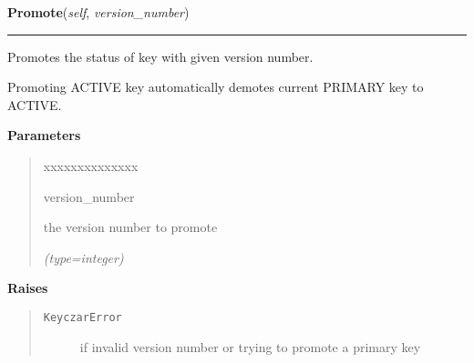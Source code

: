     \label{keyczar:keyczar:Keyczar:Promote}

    \vspace{0.5ex}

\hspace{.8\funcindent}\begin{boxedminipage}{\funcwidth}

    \raggedright \textbf{Promote}(\textit{self}, \textit{version\_number})

    \vspace{-1.5ex}

    \rule{\textwidth}{0.5\fboxrule}
\setlength{\parskip}{2ex}
    Promotes the status of key with given version number.

    Promoting ACTIVE key automatically demotes current PRIMARY key to 
    ACTIVE.

\setlength{\parskip}{1ex}
      \textbf{Parameters}
      \vspace{-1ex}

      \begin{quote}
        \begin{Ventry}{xxxxxxxxxxxxxx}

          \item[version\_number]

          the version number to promote

            {\it (type=integer)}

        \end{Ventry}

      \end{quote}

      \textbf{Raises}
    \vspace{-1ex}

      \begin{quote}
        \begin{description}

          \item[\texttt{KeyczarError}]

          if invalid version number or trying to promote a primary key

        \end{description}

      \end{quote}

    \end{boxedminipage}

